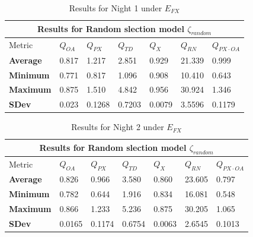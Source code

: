 \begin{table}
\begin{center}
\begin{tabular}{lllllll}
\toprule
\multicolumn{7}{c}{Results for Random slection model $\zeta_{random}$} \\
\midrule
Metric & $Q_{OA}$ & $Q_{PX}$ & $Q_{TD}$ & $Q_{X}$ & $Q_{RN}$ & $Q_{PX \cdot OA}$ \\
\midrule
{\bf Average} & 0.817  & 1.217  & 2.851  & 0.929  & 21.339 & 0.999\\
{\bf Minimum} & 0.771  & 0.817  & 1.096  & 0.908  & 10.410 & 0.643\\
{\bf Maximum} & 0.875  & 1.510  & 4.842  & 0.956  & 30.924 & 1.346\\
{\bf SDev}    & 0.023  & 0.1268 & 0.7203 & 0.0079 & 3.5596 & 0.1179\\
\bottomrule
\end{tabular}
\end{center}
\caption{Results for Night 1 under $E_{FX}$}
\end{table}

\begin{table}
\begin{center}
\begin{tabular}{lllllll}
\toprule
\multicolumn{7}{c}{Results for Random slection model $\zeta_{random}$} \\
\midrule
Metric & $Q_{OA}$ & $Q_{PX}$ & $Q_{TD}$ & $Q_{X}$ & $Q_{RN}$ & $Q_{PX \cdot OA}$ \\
\midrule
{\bf Average} & 0.826  & 0.966  & 3.580  & 0.860  & 23.605 & 0.797\\
{\bf Minimum} & 0.782  & 0.644  & 1.916  & 0.834  & 16.081 & 0.548\\
{\bf Maximum} & 0.866  & 1.233  & 5.236  & 0.875  & 30.205 & 1.065\\
{\bf SDev}    & 0.0165 & 0.1174 & 0.6754 & 0.0063 & 2.6545 & 0.1013\\
\bottomrule
\end{tabular}
\end{center}
\caption{Results for Night 2 under $E_{FX}$}
\end{table}

